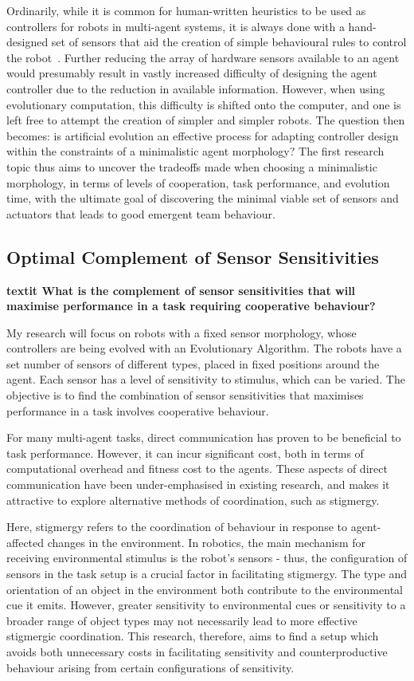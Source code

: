 \documentclass[a4paper,12pt]{article}
\begin{document}
Ordinarily, while it is common for human-written heuristics to be used as controllers for robots in multi-agent systems, it is always done with a hand-designed set of sensors that aid the creation of simple behavioural rules to control the robot~\cite{Jones03}. Further reducing the array of hardware sensors available to an agent would presumably result in vastly increased difficulty of designing the agent controller due to the reduction in available information.
However, when using evolutionary computation, this difficulty is shifted onto the computer, and one is left free to attempt the creation of simpler and simpler robots. The question then becomes: is artificial evolution an effective process for adapting controller design within the constraints of a minimalistic agent morphology? The first research topic thus aims to uncover the tradeoffs made when choosing a minimalistic morphology, in terms of levels of cooperation, task performance, and evolution time, with the ultimate goal of discovering the minimal viable set of sensors and actuators that leads to good emergent team behaviour.

\subsection{Optimal Complement of Sensor Sensitivities}

\textbf{ textit {What is the complement of sensor sensitivities that will maximise performance in a task requiring cooperative behaviour?}}

My research will focus on robots with a fixed sensor morphology, whose controllers are being evolved with an Evolutionary Algorithm. The robots have a set number of sensors of different types, placed in fixed positions around the agent. Each sensor has a level of sensitivity to stimulus, which can be varied. The objective is to find the combination of sensor sensitivities that maximises performance in a task involves cooperative behaviour.

For many multi-agent tasks, direct communication has proven to be beneficial to task performance. However, it can incur significant cost, both in terms of computational overhead and fitness cost to the agents. These aspects of direct communication have been under-emphasised in existing research\cite{Wagner00}, and makes it attractive to explore alternative methods of coordination, such as stigmergy.

Here, stigmergy refers to the coordination of behaviour in response to agent-affected changes in the environment. In robotics, the main mechanism for receiving environmental stimulus is the robot’s sensors - thus, the configuration of sensors in the task setup is a crucial factor in facilitating stigmergy. The type and orientation of an object in the environment both contribute to the environmental cue it emits. However, greater sensitivity to environmental cues or sensitivity to a broader range of object types may not necessarily lead to more effective stigmergic coordination. This research, therefore, aims to find a setup which avoids both unnecessary costs in facilitating sensitivity and counterproductive behaviour arising from certain configurations of sensitivity.
\end{document}
